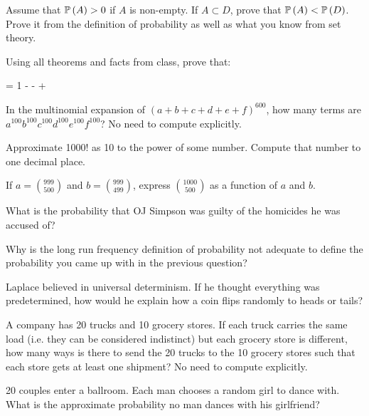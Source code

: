 \documentclass[12pt]{article}
\begin{document}
 Assume that $\mathbb{P}\left(A\right) > 0$ if $A$ is non-empty. If $A \subset D$, prove that $\mathbb{P}\left(A\right) < \mathbb{P}\left(D\right)$. Prove it from the definition of probability as well as what you know from set theory.


 Using all theorems and facts from class, prove that:

\beqn
{} = 1 -  -  + 
\eeqn{}


 In the multinomial expansion of $(a+b+c+d+e+f)^{600}$, how many terms are $a^{100} b^{100} c^{100} d^{100}e^{100}f^{100}$? No need to compute explicitly.


  Approximate 1000! as 10 to the power of some number. Compute that number to one decimal place.

  If $a = \binom{999}{500}$ and $b = \binom{999}{499}$, express $\binom{1000}{500}$ as a function of $a$ and $b$.


 What is the probability that OJ Simpson was guilty of the homicides he was accused of?


 Why is the long run frequency definition of probability not adequate to define the probability you came up with in the previous question? 

 Laplace believed in universal determinism. If he thought everything was predetermined, how would he explain how a coin flips randomly to heads or tails? 


 A company has 20 trucks and 10 grocery stores. If each truck carries the same load (i.e. they can be considered indistinct) but each grocery store is different, how many ways is there to send the 20 trucks to the 10 grocery stores such that each store gets at least one shipment? No need to compute explicitly. 

 20 couples enter a ballroom. Each man chooses a random girl to dance with. What is the approximate probability no man dances with his girlfriend?
\eenum
\end{document}
